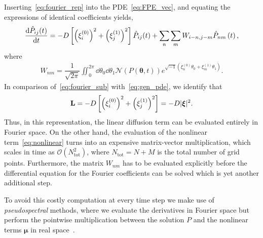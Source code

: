 \documentclass[11pt]{article}
\newcommand{\Phat}{\hat{P}}
\newcommand{\mN}{\bm{\mathcal{N}}}
\begin{document}
Inserting~\eqref{eq:fourier_rep} into the PDE~\eqref{eq:FPE_vec}, and equating the expressions of identical coefficients yields,
\begin{align}
    \dv{\Phat_{ij}(t)}{t} = -D\left[\left(\xi^{(0)}_{i}\right)^{2} + \left(\xi^{(1)}_{j}\right)^{2}\right]\Phat_{ij}(t) + \sum\limits_{n}\sum\limits_{m}W_{i-n,j-    m}\Phat_{nm}\left(t\right),\label{eq:fourier_sub}
\end{align}
where 
\begin{align}
    W_{nm} = \dfrac{1}{\sqrt{2\pi}}\iint_{0}^{2\pi}\dd{\theta_{0}}\dd{\theta_{1}}\mN(P(\bm{\theta},t))e^{\sqrt{-1}\left(\xi^{(0)}_{n}\theta_{0}+\xi^{(1)}_{m}\theta_{1}\right)}.
\end{align}
In comparison of~\eqref{eq:fourier_sub} with~\eqref{eq:gen_pde}, we identify that 
\begin{align}
    \vb{L} = -D\left[\left(\xi^{(0)}_{i}\right)^{2} + \left(\xi^{(1)}_{j}\right)^{2}\right] = -D|\bm{\xi}|^{2}.\label{eq:fourier_linear}
\end{align}
Thus, in this representation, the linear diffusion term can be evaluated entirely in Fourier space. On the other hand, the evaluation of the nonlinear term~\eqref{eq:nonlinear} turns into an expensive matrix-vector multiplication, which scales in time as $\mathcal{O}(N_{\mathrm{tot}}^{2})$, where $N_{\mathrm{tot}} = N + M$ is the total number of grid points.  Furthermore, the matrix $W_{nm}$ has to be evaluated explicitly before the differential equation for the Fourier coefficients can be solved which is yet another additional step. 

To avoid this costly computation at every time step we make use of \emph{pseudospectral} methods, where we evaluate the derivatives in Fourier space but perform the pointwise multiplication between the solution $P$ and the nonlinear terms $\bm{\mu}$ in real space~\cite{boyd2013chebyshev}.
\end{document}
